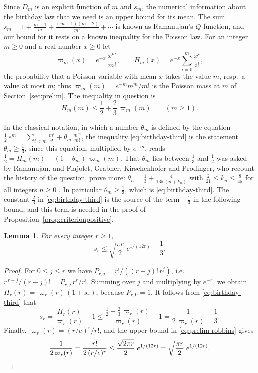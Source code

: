 \documentclass{amsart}
\makeatletter
\newtheorem{lemma}[theorem]{Lemma}
\theoremstyle{definition}
\theoremstyle{remark}
\numberwithin{equation}{section}
\def\subsection{\@startsection{subsection}{2}\z@{.5\linespacing\@plus.7\linespacing}{-.5em}{\normalfont\bfseries\boldmath}}
\makeatother
\begin{document}
\subsection{The mean of the birthday law}\label{subsec:birthday-mean}

Since $D_m$ is an explicit function of $m$ and $s_m$, the numerical information about the birthday law that we need is an upper bound for its mean. The sum $s_m=1+\frac{m-1}{m}+\frac{(m-1)(m-2)}{m^2}+\cdots$ is known as Ramanujan's $Q$-function, and our bound for it rests on a known inequality for the Poisson law. For an integer $m\ge 0$ and a real number $x\ge 0$ let
\[
\varpi_m(x)=e^{-x}\,\frac{x^m}{m!},\qquad H_m(x)=e^{-x}\sum_{i=0}^{m}\frac{x^i}{i!},
\]
the probability that a Poisson variable with mean $x$ takes the value $m$, resp.\ a value at most $m$; thus $\varpi_m(m)=e^{-m}m^m/m!$ is the Poisson mass at $m$ of Section~\ref{sec:prelim}. The inequality in question is
\begin{equation}\label{eq:birthday-third}
H_m(m)\le\frac12+\frac23\,\varpi_m(m)\qquad(m\ge 1).
\end{equation}

In the classical notation, in which a number $\theta_m$ is defined by the equation $\frac12\,e^{m}=\sum_{i<m}\frac{m^i}{i!}+\theta_m\,\frac{m^m}{m!}$, the inequality \eqref{eq:birthday-third} is the statement $\theta_m\ge\frac13$, since this equation, multiplied by $e^{-m}$, reads $\frac12=H_m(m)-(1-\theta_m)\,\varpi_m(m)$. That $\theta_m$ lies between $\frac13$ and $\frac12$ was asked by Ramanujan, and Flajolet, Grabner, Kirschenhofer and Prodinger, who recount the history of the question, prove more: $\theta_n=\frac13+\frac{4}{135\,(n+k_n)}$ with $\frac{2}{21}\le k_n\le\frac{8}{45}$ for all integers $n\ge 0$ \cite[Theorem~7]{flajolet1995}. In particular $\theta_m\ge\frac13$, which is \eqref{eq:birthday-third}. The constant $\frac23$ in \eqref{eq:birthday-third} is the source of the term $-\frac13$ in the following bound, and this term is needed in the proof of Proposition~\ref{prop:criterionpositive}.

\begin{lemma}\label{lem:birthdaymean}
For every integer $r\ge 1$,
\[
s_r\le\sqrt{\frac{\pi r}{2}}\;e^{1/(12r)}-\frac13.
\]
\end{lemma}

\begin{proof}
For $0\le j\le r$ we have $P_{r,j}=r!/((r-j)!\,r^{j})$, i.e.\ $r^{\,r-j}/(r-j)!=P_{r,j}\,r^r/r!$. Summing over $j$ and multiplying by $e^{-r}$, we obtain $H_r(r)=\varpi_r(r)\,(1+s_r)$, because $P_{r,0}=1$. It follows from \eqref{eq:birthday-third} that
\[
s_r=\frac{H_r(r)}{\varpi_r(r)}-1\le\frac{\frac12+\frac23\,\varpi_r(r)}{\varpi_r(r)}-1=\frac{1}{2\,\varpi_r(r)}-\frac13.
\]
Finally, $\varpi_r(r)=(r/e)^r/r!$, and the upper bound in \eqref{eq:prelim-robbins} gives
\[
\frac{1}{2\,\varpi_r(r)}=\frac{r!}{2\,(r/e)^r}\le\frac{\sqrt{2\pi r}}{2}\;e^{1/(12r)}=\sqrt{\frac{\pi r}{2}}\;e^{1/(12r)}.\qedhere
\]
\end{proof}
\end{document}
